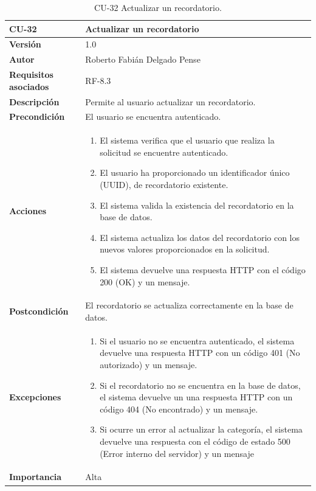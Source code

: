 \begin{table}[p]
	\centering
	\begin{tabularx}{\linewidth}{ p{} p{} }
		\toprule
		\textbf{CU-32}    & \textbf{Actualizar un recordatorio}\\
		\toprule
		\textbf{Versión}              & 1.0    \\
		\textbf{Autor}                & Roberto Fabián Delgado Pense \\
		\textbf{Requisitos asociados} & RF-8.3 \\ 
		\textbf{Descripción}          & Permite al usuario actualizar un recordatorio. \\
		\textbf{Precondición}         & El usuario se encuentra autenticado. \\
		\textbf{Acciones}             &
		\begin{enumerate}
			\def\labelenumi{\arabic{enumi}.}
			\tightlist
                \item El sistema verifica que el usuario que realiza la solicitud se encuentre autenticado.
			\item El usuario ha proporcionado un identificador único (UUID), de recordatorio existente.
			\item El sistema valida la existencia del recordatorio en la base de datos.
                \item El sistema actualiza los datos del recordatorio con los nuevos valores proporcionados en la solicitud.
                \item El sistema devuelve una respuesta HTTP con el código 200 (OK) y un mensaje.
            \end{enumerate}\\
		\textbf{Postcondición}        & El recordatorio se actualiza correctamente en la base de datos.\\
		\textbf{Excepciones}          & 
            \begin{enumerate}
			\def\labelenumi{\arabic{enumi}.}
			\tightlist
   			\item Si el usuario no se encuentra autenticado, el sistema devuelve una                 respuesta HTTP con un código 401 (No autorizado) y un mensaje.
                \item   Si el recordatorio no se encuentra en la base de datos, el sistema devuelve un                           una respuesta HTTP con un código 404 (No encontrado) y un mensaje. 
                \item Si ocurre un error al actualizar la categoría, el sistema devuelve una respuesta con el código de estado 500 (Error interno del servidor) y un mensaje
            \end{enumerate}\\
		\textbf{Importancia}          & Alta \\
		\bottomrule
	\end{tabularx}
	\caption{CU-32 Actualizar un recordatorio.}
\end{table}

